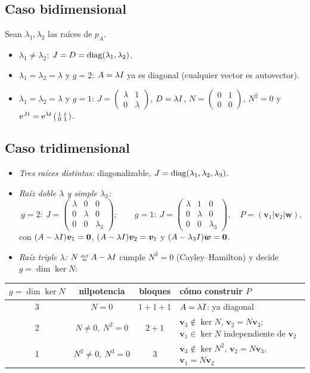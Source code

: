 \documentclass[11pt,twoside]{article}
\newcommand\vv{\bm{v}}
\newcommand\mat[1]{\begin{pmatrix}#1\end{pmatrix}}
\newcommand\smat[1]{\left(\begin{smallmatrix}#1\end{smallmatrix}\right)}
\begin{document}
\subsection{Caso bidimensional}

Sean $\lambda_1,\lambda_2$ las raíces de $p_A$.
\begin{itemize}
\item $\lambda_1\neq\lambda_2$: $J=D=\operatorname{diag}(\lambda_1,\lambda_2)$.
\item $\lambda_1=\lambda_2=\lambda$ y $g=2$: $A=\lambda I$ ya es diagonal (cualquier vector es autovector).
\item $\lambda_1=\lambda_2=\lambda$ y $g=1$:
$J=\smat{\lambda&1\\0&\lambda}$, $D=\lambda I$, $N=\smat{0&1\\0&0}$, $N^2=0$ y $\e^{Jt}=\e^{\lambda t}\smat{1&t\\0&1}$.
\end{itemize}

\subsection{Caso tridimensional}

\begin{itemize}
\item \emph{Tres raíces distintas:} diagonalizable, $J=\operatorname{diag}(\lambda_1,\lambda_2,\lambda_3)$.
\item \emph{Raíz doble $\lambda$ y simple $\lambda_3$:}
\begin{equation*}
g=2:\ J=\mat{\lambda&0&0\\0&\lambda&0\\0&0&\lambda_3};\qquad
g=1:\ J=\mat{\lambda&1&0\\0&\lambda&0\\0&0&\lambda_3},\quad P=(\vv_1|\vv_2|\bm w),
\end{equation*}
con $(A-\lambda\Id)\vv_1=\bm0$, $(A-\lambda\Id)\vv_2=\vv_1$ y $(A-\lambda_3I)\bm w=\bm0$.
\item \emph{Raíz triple $\lambda$:} $N\defeq A-\lambda\Id$ cumple $N^3=0$ (Cayley--Hamilton) y decide $g=\dim\ker N$:
\end{itemize}

\begin{center}
\renewcommand\arraystretch{1.35}
\begin{tabular}{@{}c c c p{7.6cm}@{}}
\toprule
\textcolor{acc}{$g=\dim\ker N$} & \textcolor{acc}{nilpotencia} & \textcolor{acc}{bloques} & \textcolor{acc}{cómo construir $P$}\\
\midrule
3 & $N=0$ & $1+1+1$ & $A=\lambda I$: ya diagonal\\
2 & $N\neq0,\ N^2=0$ & $2+1$ & $\vv_3\notin\ker N$, $\vv_2=N\vv_3$; $\vv_1\in\ker N$ independiente de $\vv_2$\\[2pt]
1 & $N^2\neq0,\ N^3=0$ & $3$ & $\vv_3\notin\ker N^2$, $\vv_2=N\vv_3$, $\vv_1=N\vv_2$\\
\bottomrule
\end{tabular}
\end{center}
\end{document}
